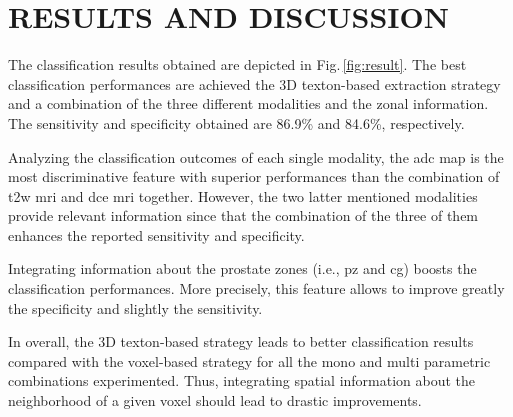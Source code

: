 \section{RESULTS AND DISCUSSION}\label{sec:results}



The classification results obtained are depicted in Fig.\,\ref{fig:result}. The best classification performances are achieved the 3D texton-based extraction strategy and a combination of the three different modalities and the zonal information. The sensitivity and specificity obtained are 86.9\% and 84.6\%, respectively.

Analyzing the classification outcomes of each single modality, the \ac{adc} map is the most discriminative feature with superior performances than the combination of \ac{t2w} \ac{mri} and \ac{dce} \ac{mri} together. However, the two latter mentioned modalities provide relevant information since that the combination of the three of them enhances the reported sensitivity and specificity. 

Integrating information about the prostate zones (i.e., \ac{pz} and \ac{cg}) boosts the classification performances. More precisely, this feature allows to improve greatly the specificity and slightly the sensitivity. 

In overall, the 3D texton-based strategy leads to better classification results compared with the voxel-based strategy for all the mono and multi parametric combinations experimented. Thus, integrating spatial information about the neighborhood of a given voxel should lead to drastic improvements.

